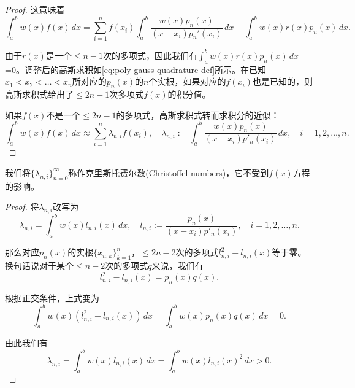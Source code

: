 \begin{subappendices}
\begin{proof}
这意味着
\begin{equation*}
  \int_a^b w(x) f(x) \, dx = \sum_{i=1}^{n} f(x_i) \int_a^b \frac{w(x) p_n(x)}{(x-x_i) p_n'(x_i)} \, dx+ \int_a^b w(x) r(x) p_n(x) \, dx.
\end{equation*}

由于$r(x)$是一个$\le n-1$次的多项式，因此我们有$\int_a^b w(x) r(x) p_n(x) \, dx$=0。调整后的高斯求积如\eqref{eq:poly-gauss-quadrature-def}所示。在已知$x_1 < x_2 < \ldots <x_n$所对应的$p_n(x)$的$n$个实根，如果对应的$f(x_i)$也是已知的，则高斯求积式给出了$\le 2n-1$次多项式$f(x)$的积分值。

如果$f(x)$不是一个$\le 2n-1$的多项式，高斯求积式转而求积分的近似：
\begin{equation*}
  \int_a^b w(x) f(x) \, dx \approx \sum_{i=1}^n \lambda_{n,i} f(x_i), \quad \lambda_{n,i}:= \int_a^b \frac{w(x) p_n(x)}{\left( x-x_i \right) p'_n(x_i)} \, dx, \quad i=1,2,\ldots,n.
\end{equation*}
\end{proof}

我们将$\{ \lambda_{n,i} \}_{n=0}^{\infty}$称作克里斯托费尔数(Christoffel numbers)，它不受到$f(x)$方程的影响。


\begin{theorem}[克里斯托费尔数的值全部为正]

\end{theorem}
\begin{proof}
将$\lambda_{n,i}$改写为
\begin{equation*}
  \lambda_{n,i} = \int_a^b w(x) l_{n,i}(x) \, dx, \quad l_{n,i} := \frac{p_n(x)}{(x-x_i) p'_n(x_i)}, \quad i=1,2,\ldots,n.
\end{equation*}

那么对应$p_n(x)$的实根$\{ x_{n,k} \}_{k=1}^{n}$，$\le 2n-2$次的多项式$l_{n,i}^2-l_{n,i}(x)$等于零。换句话说对于某个$\le n-2$次的多项式$q$来说，我们有
\begin{equation*}
  l_{n,i}^2-l_{n,i}(x) = p_n(x) q(x).
\end{equation*}

根据正交条件，上式变为
\begin{equation*}
  \int_{a}^{b} w(x) \left( l_{n,i}^2-l_{n,i}(x) \right) \, dx = \int_a^b w(x) p_n(x) q(x) \, dx = 0.
\end{equation*}

由此我们有\begin{equation*}
\lambda_{n,i} = \int_a^b w(x) l_{n,i}(x) \, dx = \int_a^b w(x) l_{n,i}(x)^2 \, dx > 0.
\end{equation*}
\end{proof}


\end{subappendices}
